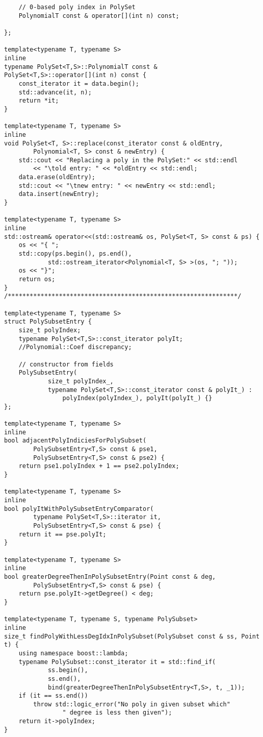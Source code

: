 \begin{lstlisting}
    // 0-based poly index in PolySet
    PolynomialT const & operator[](int n) const;

};

template<typename T, typename S>
inline
typename PolySet<T,S>::PolynomialT const &
PolySet<T,S>::operator[](int n) const {
    const_iterator it = data.begin();
    std::advance(it, n);
    return *it;
}

template<typename T, typename S>
inline
void PolySet<T, S>::replace(const_iterator const & oldEntry,
        Polynomial<T, S> const & newEntry) {
    std::cout << "Replacing a poly in the PolySet:" << std::endl
        << "\told entry: " << *oldEntry << std::endl;
    data.erase(oldEntry);
    std::cout << "\tnew entry: " << newEntry << std::endl;
    data.insert(newEntry);
}

template<typename T, typename S>
inline
std::ostream& operator<<(std::ostream& os, PolySet<T, S> const & ps) {
    os << "{ ";
    std::copy(ps.begin(), ps.end(),
            std::ostream_iterator<Polynomial<T, S> >(os, "; "));
    os << "}";
    return os;
}
/***************************************************************/

template<typename T, typename S>
struct PolySubsetEntry {
    size_t polyIndex;
    typename PolySet<T,S>::const_iterator polyIt;
    //Polynomial::Coef discrepancy;

    // constructor from fields
    PolySubsetEntry(
            size_t polyIndex_,
            typename PolySet<T,S>::const_iterator const & polyIt_) :
                polyIndex(polyIndex_), polyIt(polyIt_) {}
};

template<typename T, typename S>
inline
bool adjacentPolyIndiciesForPolySubset(
        PolySubsetEntry<T,S> const & pse1,
        PolySubsetEntry<T,S> const & pse2) {
    return pse1.polyIndex + 1 == pse2.polyIndex;
}

template<typename T, typename S>
inline
bool polyItWithPolySubsetEntryComparator(
        typename PolySet<T,S>::iterator it,
        PolySubsetEntry<T,S> const & pse) {
    return it == pse.polyIt;
}

template<typename T, typename S>
inline
bool greaterDegreeThenInPolySubsetEntry(Point const & deg,
        PolySubsetEntry<T,S> const & pse) {
    return pse.polyIt->getDegree() < deg;
}

template<typename T, typename S, typename PolySubset>
inline
size_t findPolyWithLessDegIdxInPolySubset(PolySubset const & ss, Point t) {
    using namespace boost::lambda;
    typename PolySubset::const_iterator it = std::find_if(
            ss.begin(), 
            ss.end(),
            bind(greaterDegreeThenInPolySubsetEntry<T,S>, t, _1));
    if (it == ss.end())
        throw std::logic_error("No poly in given subset which"
                " degree is less then given");
    return it->polyIndex;
}


\end{lstlisting}
